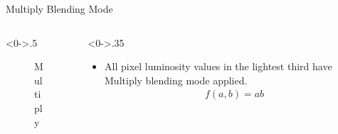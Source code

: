 \documentclass{beamer}
\begin{document}
		\begin{frame}{Multiply Blending Mode}
 
		\begin{columns}[T]
			\begin{column}<0->{.5\textwidth}
				\begin{figure}[thpb]
					\centering
					\caption{Multiply}
					\label{fig:1}
				\end{figure}
			\end{column}%
			\hfill%
			\begin{column}<0->{.35\textwidth}
				


			    \begin{itemize} 
			    \item All pixel luminosity values in the lightest third have Multiply blending mode applied. 
			    \begin{align*} f(a,b) = ab \end{align*}
			    
			    \end{itemize}
		        
			\end{column}
		\end{columns}
	\end{frame}
	
\end{document}
